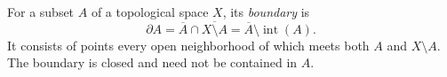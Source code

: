 
For a subset $A$ of a topological space $X$, its \emph{boundary} is
\[
\partial A=\overline A\cap\overline{X\setminus A}=\overline A\setminus\operatorname{int}(A).
\]
It consists of points every open neighborhood of which meets both $A$ and $X\setminus A$. The boundary is closed and need not be contained in $A$.
